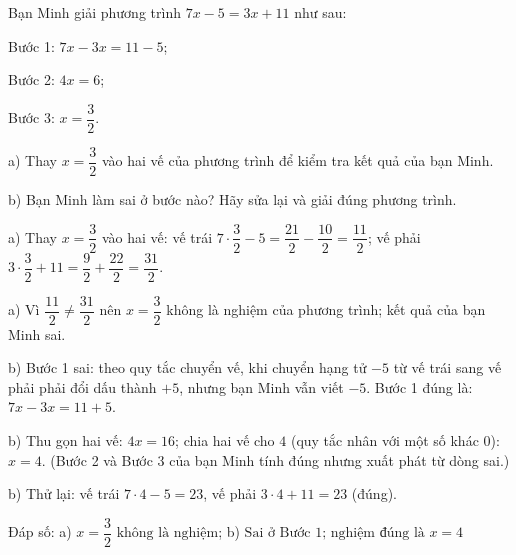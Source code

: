 \begin{problem}[8DS-PT1-022]
Bạn Minh giải phương trình $7x - 5 = 3x + 11$ như sau:

Bước 1: $7x - 3x = 11 - 5$;

Bước 2: $4x = 6$;

Bước 3: $x = \dfrac{3}{2}$.

a) Thay $x = \dfrac{3}{2}$ vào hai vế của phương trình để kiểm tra kết quả của bạn Minh.

b) Bạn Minh làm sai ở bước nào? Hãy sửa lại và giải đúng phương trình.

\begin{solution}
a) Thay $x = \dfrac{3}{2}$ vào hai vế: vế trái $7 \cdot \dfrac{3}{2} - 5 = \dfrac{21}{2} - \dfrac{10}{2} = \dfrac{11}{2}$; vế phải $3 \cdot \dfrac{3}{2} + 11 = \dfrac{9}{2} + \dfrac{22}{2} = \dfrac{31}{2}$.

a) Vì $\dfrac{11}{2} \neq \dfrac{31}{2}$ nên $x = \dfrac{3}{2}$ không là nghiệm của phương trình; kết quả của bạn Minh sai.

b) Bước 1 sai: theo quy tắc chuyển vế, khi chuyển hạng tử $-5$ từ vế trái sang vế phải phải đổi dấu thành $+5$, nhưng bạn Minh vẫn viết $-5$. Bước 1 đúng là: $7x - 3x = 11 + 5$.

b) Thu gọn hai vế: $4x = 16$; chia hai vế cho $4$ (quy tắc nhân với một số khác $0$): $x = 4$. (Bước 2 và Bước 3 của bạn Minh tính đúng nhưng xuất phát từ dòng sai.)

b) Thử lại: vế trái $7 \cdot 4 - 5 = 23$, vế phải $3 \cdot 4 + 11 = 23$ (đúng).

Đáp số: a) $\boxed{x = \dfrac{3}{2} \text{ không là nghiệm}}$; b) $\boxed{\text{Sai ở Bước 1; nghiệm đúng là } x = 4}$
\end{solution}
\end{problem}

